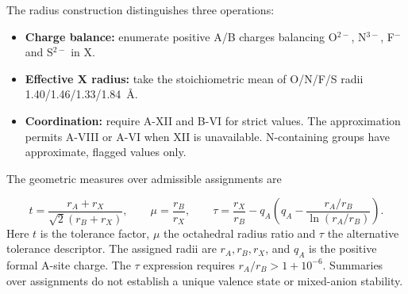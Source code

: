 The radius construction distinguishes three operations:
\begin{itemize}
  \item \textbf{Charge balance:} enumerate positive A/B charges balancing O$^{2-}$, N$^{3-}$, F$^{-}$ and S$^{2-}$ in X.
  \item \textbf{Effective X radius:} take the stoichiometric mean of O/N/F/S radii 1.40/1.46/1.33/1.84~\AA.
  \item \textbf{Coordination:} require A-XII and B-VI for strict values. The approximation permits A-VIII or A-VI when XII is unavailable. N-containing groups have approximate, flagged values only.
\end{itemize}
The geometric measures over admissible assignments are
\begin{samepage}
\begin{equation}
 t=\frac{r_A+r_X}{\sqrt{2}(r_B+r_X)},\qquad
 \mu=\frac{r_B}{r_X},\qquad
 \tau=\frac{r_X}{r_B}-q_A\left(q_A-\frac{r_A/r_B}{\ln(r_A/r_B)}\right).
 \label{eq:geometry}
\end{equation}
\noindent Here $t$ is the tolerance factor, $\mu$ the octahedral radius ratio and $\tau$ the alternative tolerance descriptor. The assigned radii are $r_A,r_B,r_X$, and $q_A$ is the positive formal A-site charge. The $\tau$ expression requires $r_A/r_B>1+10^{-6}$. Summaries over assignments do not establish a unique valence state or mixed-anion stability.
\end{samepage}

